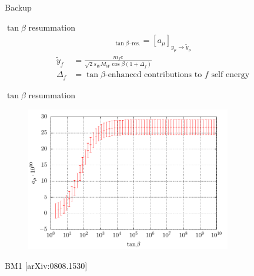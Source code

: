 \documentclass[hyperref={pdfpagelabels=false},ngerman]{beamer}
\newcommand{\amu}{a_\mu}
\begin{document}

\begin{frame}[noframenumbering]
  \begin{center}
    \Huge Backup
  \end{center}
\end{frame}

\begin{frame}[noframenumbering]{$\tan\beta$ resummation}
  \begin{align*}
    [\amu]_{\tan\beta\text{--res.}} = [\amu]_{y_\mu \rightarrow \tilde{y}_\mu}
  \end{align*}
  \begin{align*}
    \tilde{y}_f &= \frac{m_f e}{\sqrt{2} s_W M_W \cos\beta (1 + \Delta_f)} \\
    \Delta_f &= \tan\beta\text{-enhanced contributions to $f$ self energy}
  \end{align*}
\end{frame}

\begin{frame}[noframenumbering]{$\tan\beta$ resummation}
  \begin{figure}
    \centering
    \includegraphics[width=0.8\textwidth]{plots/tb-infinity}
  \end{figure}
  BM1 [arXiv:0808.1530]
\end{frame}
\end{document}
